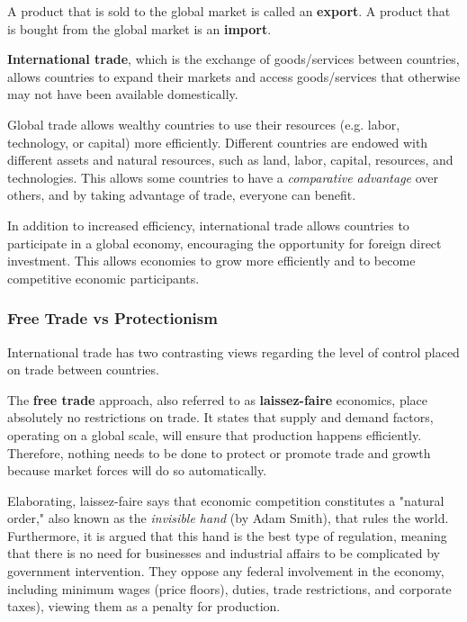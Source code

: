 \documentclass{article}
\begin{document}
    \begin{definition}
      A product that is sold to the global market is called an \textbf{export}. A product that is bought from the global market is an \textbf{import}. 
    \end{definition}

    \begin{definition}
      \textbf{International trade}, which is the exchange of goods/services between countries, allows countries to expand their markets and access goods/services that otherwise may not have been available domestically. 

      Global trade allows wealthy countries to use their resources (e.g. labor, technology, or capital) more efficiently. Different countries are endowed with different assets and natural resources, such as land, labor, capital, resources, and technologies. This allows some countries to have a \textit{comparative advantage} over others, and by taking advantage of trade, everyone can benefit. 

      In addition to increased efficiency, international trade allows countries to participate in a global economy, encouraging the opportunity for foreign direct investment. This allows economies to grow more efficiently and to become competitive economic participants. 
    \end{definition}

    \subsubsection{Free Trade vs Protectionism}

      International trade has two contrasting views regarding the level of control placed on trade between countries. 

      \begin{definition}
        The \textbf{free trade} approach, also referred to as \textbf{laissez-faire} economics, place absolutely no restrictions on trade. It states that supply and demand factors, operating on a global scale, will ensure that production happens efficiently. Therefore, nothing needs to be done to protect or promote trade and growth because market forces will do so automatically.

        Elaborating, laissez-faire says that economic competition constitutes a "natural order," also known as the \textit{invisible hand} (by Adam Smith), that rules the world. Furthermore, it is argued that this hand is the best type of regulation, meaning that there is no need for businesses and industrial affairs to be complicated by government intervention. They oppose any federal involvement in the economy, including minimum wages (price floors), duties, trade restrictions, and corporate taxes), viewing them as a penalty for production. 
      \end{definition}
\end{document}
